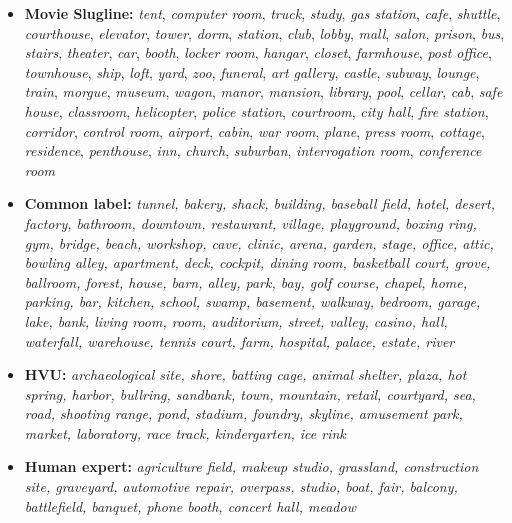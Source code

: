 \begin{itemize}
    \item \textbf{Movie Slugline:} \textit{tent}, \textit{computer room}, \textit{truck}, \textit{study},
 \textit{gas station}, \textit{cafe}, \textit{shuttle}, \textit{courthouse}, \textit{elevator}, \textit{tower}, \textit{dorm}, \textit{station}, \textit{club}, \textit{lobby}, \textit{mall}, \textit{salon}, \textit{prison}, \textit{bus}, \textit{stairs}, \textit{theater}, \textit{car}, \textit{booth}, \textit{locker room}, \textit{hangar}, \textit{closet},
 \textit{farmhouse}, \textit{post office}, \textit{townhouse}, \textit{ship}, \textit{loft}, \textit{yard}, \textit{zoo}, \textit{funeral}, \textit{art gallery}, \textit{castle}, \textit{subway}, \textit{lounge}, \textit{train}, \textit{morgue}, \textit{museum}, \textit{wagon}, \textit{manor}, \textit{mansion}, \textit{library}, \textit{pool}, \textit{cellar}, \textit{cab}, \textit{safe house}, \textit{classroom}, \textit{helicopter}, \textit{police station}, \textit{courtroom}, \textit{city hall}, \textit{fire station}, \textit{corridor}, \textit{control room}, \textit{airport}, \textit{cabin}, \textit{war room}, \textit{plane}, \textit{press room}, \textit{cottage}, \textit{residence}, \textit{penthouse}, \textit{inn}, \textit{church}, \textit{suburban}, \textit{interrogation room}, \textit{conference room}

 \item \textbf{Common label:} \textit{tunnel, bakery, shack, building, baseball field, hotel, desert, factory, bathroom, downtown, restaurant, village, playground, boxing ring, gym, bridge, beach, workshop, cave, clinic, arena, garden, stage, office, attic, bowling alley, apartment, deck, cockpit, dining room, basketball court, grove, ballroom, forest, house, barn, alley, park, bay, golf course, chapel, home, parking, bar, kitchen, school, swamp, basement, walkway, bedroom, garage, lake, bank, living room, room,
 auditorium, street, valley, casino, hall, waterfall, warehouse,
 tennis court, farm, hospital, palace, estate, river}
 
 \item \textbf{HVU:} \textit{archaeological site, shore,
 batting cage, animal shelter, plaza, hot spring,
 harbor, bullring, sandbank, town, mountain,
 retail, courtyard, sea, road, shooting range,
 pond, stadium, foundry, skyline, amusement park,
 market, laboratory, race track, kindergarten, ice rink}

\item \textbf{Human expert:} \textit{agriculture field, makeup studio, grassland, construction site,
 graveyard, automotive repair, overpass, studio, boat, fair, balcony, battlefield, banquet, phone booth,
 concert hall, meadow}
\end{itemize}

